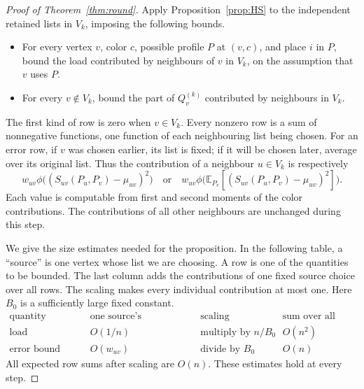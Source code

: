 \documentclass[11pt]{article}
\theoremstyle{definition}\newtheorem{algorithm}{Algorithm}[section]
\numberwithin{equation}{section}
\theoremstyle{remark}\newtheorem*{remark}{Remark}
\newcommand{\E}{\mathbb E}
\begin{document}
\begin{proof}[Proof of Theorem~\ref{thm:round}]
Apply Proposition~\ref{prop:HS} to the independent retained lists in
$V_k$, imposing the following bounds.
\begin{itemize}
\item For every vertex $v$, color $c$, possible profile $P$ at
$(v,c)$, and place $i$ in $P$, bound the load contributed by neighbours
of $v$ in $V_k$, on the assumption that $v$ uses $P$.
\item For every $v\notin V_k$, bound the part of $Q_v^{(k)}$ contributed
by neighbours in $V_k$.
\end{itemize}
The first kind of row is zero when $v\in V_k$. Every nonzero row is a
sum of nonnegative functions, one function of each neighbouring list
being chosen. For an error row, if $v$ was chosen earlier, its list is
fixed; if it will be chosen later, average over its original list.
Thus the contribution of a neighbour $u\in V_k$ is respectively
\[
 w_{uv}\phi\bigl((S_{uv}(P_u,P_v)-\mu_{uv})^2\bigr)
 \quad\text{or}\quad
 w_{uv}\phi\bigl(\E_{P_v}[(S_{uv}(P_u,P_v)-\mu_{uv})^2]\bigr).
\]
Each value is computable from first and second moments of the color
contributions. The contributions of all other neighbours are unchanged
during this step.

We give the size estimates needed for the proposition. In the following
table, a ``source'' is one vertex whose list we are choosing. A row is one
of the quantities to be bounded. The last column adds the contributions
of one fixed source choice over all rows. The scaling makes every
individual contribution at most one. Here $B_0$ is a sufficiently large
fixed constant.
\begin{equation}\label{eq:APtable}
\begin{array}{c|c|c|c}
 \text{quantity bounded}&\text{one source's contribution}
 &\text{scaling}&\text{sum over all rows}\\ \hline
 \text{load}&O(1/n)&\text{multiply by }n/B_0&O(n^2)\\
 \text{error bound}&O(w_{uv})&\text{divide by }B_0&O(n)
\end{array}
\end{equation}
All expected row sums after scaling are $O(n)$.
These estimates hold at every step.


\end{proof}
\end{document}
